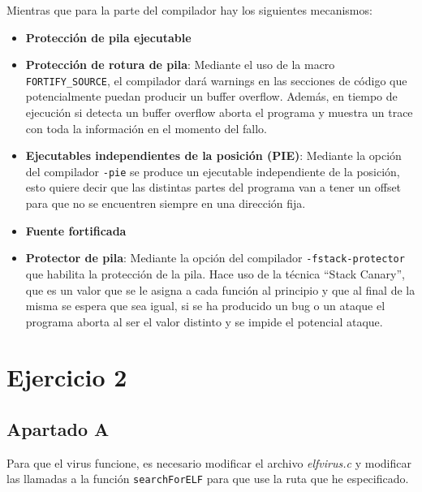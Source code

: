 \documentclass{article}
\begin{document}
\bigskip

Mientras que para la parte del compilador hay los siguientes mecanismos:

\begin{itemize}
    \item \textbf{Protección de pila ejecutable}
    \item \textbf{Protección de rotura de pila}: Mediante el uso de la macro \verb|FORTIFY_SOURCE|, el compilador dará warnings en las secciones de código que potencialmente puedan producir un buffer overflow. Además, en tiempo de ejecución si detecta un buffer overflow aborta el programa y muestra un trace con toda la información en el momento del fallo.
    \item \textbf{Ejecutables independientes de la posición (PIE)}: Mediante la opción del compilador \verb|-pie| se produce un ejecutable independiente de la posición, esto quiere decir que las distintas partes del programa van a tener un offset para que no se encuentren siempre en una dirección fija.
    \item \textbf{Fuente fortificada}
    \item \textbf{Protector de pila}: Mediante la opción del compilador \verb|-fstack-protector| que habilita la protección de la pila. Hace uso de la técnica ``Stack Canary'', que es un valor que se le asigna a cada función al principio y que al final de la misma se espera que sea igual, si se ha producido un bug o un ataque el programa aborta al ser el valor distinto y se impide el potencial ataque.
\end{itemize}

\section*{Ejercicio 2}

\subsection*{Apartado A}

Para que el virus funcione, es necesario modificar el archivo \textit{elfvirus.c} y modificar las llamadas a la función \verb|searchForELF| para que use la ruta que he especificado.
\end{document}
